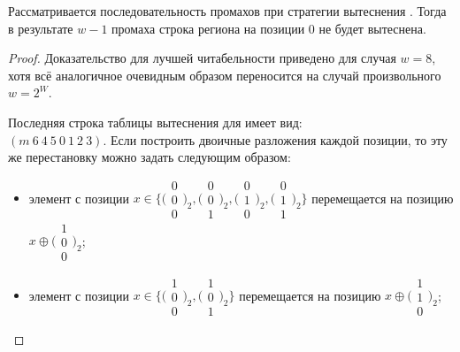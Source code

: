 \begin{lemma}\label{PseudoLRUNolDisplacing}
Рассматривается последовательность промахов при стратегии вытеснения \PseudoLRU. Тогда в результате $w{-}1$ промаха строка региона на позиции 0 не будет вытеснена.
\end{lemma}
\begin{proof}
    Доказательство для лучшей читабельности приведено для случая $w = 8$, хотя всё аналогичное очевидным образом переносится на случай произвольного $w = 2^W$.

    Последняя строка таблицы вытеснения для \PseudoLRU имеет вид:\\$(m~6~4~5~0~1~2~3)$. Если построить двоичные разложения каждой позиции, то эту же перестановку можно задать следующим образом:
    \begin{itemize}
        \item элемент с позиции $x \in \{\bigl(\begin{smallmatrix}0\\0\\0
\end{smallmatrix}\bigr)_2, \bigl(\begin{smallmatrix}0\\0\\1
\end{smallmatrix}\bigr)_2, \bigl(\begin{smallmatrix}0\\1\\0
\end{smallmatrix}\bigr)_2, \bigl(\begin{smallmatrix}0\\1\\1
\end{smallmatrix}\bigr)_2\}$ перемещается на позицию $x \oplus \bigl(\begin{smallmatrix}1\\0\\0\end{smallmatrix}\bigr)_2$;
        \item элемент с позиции $x \in \{\bigl(\begin{smallmatrix}1\\0\\0
\end{smallmatrix}\bigr)_2, \bigl(\begin{smallmatrix}1\\0\\1
\end{smallmatrix}\bigr)_2\}$ перемещается на позицию $x \oplus \bigl(\begin{smallmatrix}1\\1\\0\end{smallmatrix}\bigr)_2$;

\end{itemize}
\end{proof}
